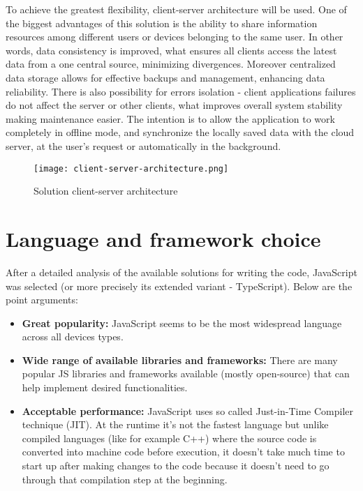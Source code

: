 To achieve the greatest flexibility, client-server architecture will be used. One of the biggest advantages of this solution is the ability to share information resources among different users or devices belonging to the same user. In other words, data consistency is improved, what ensures all clients access the latest data from a one central source, minimizing divergences. Moreover centralized data storage allows for effective backups and management, enhancing data reliability. There is also possibility for errors isolation - client applications failures do not affect the server or other clients, what improves overall system stability making  maintenance easier.
The intention is to allow the application to work completely in offline mode, and synchronize the locally saved data with the cloud server, at the user's request or automatically in the background. 

\begin{figure}[H]
    \centering
    \texttt{[image: client-server-architecture.png]}
    \caption[Solution Architecture]{\label{fig:architecture} Solution client-server architecture }
\end{figure}

 

\section{{Language and framework choice}}

After a detailed analysis of the available solutions for writing the code, JavaScript was selected (or more precisely its extended variant - TypeScript). Below are the point arguments:

\begin{itemize}
  \item \textbf{Great popularity:} JavaScript seems to be the most widespread language across all devices types.
  \item \textbf{Wide range of available libraries and frameworks:} There are many popular JS libraries and frameworks available (mostly open-source) that can help implement desired functionalities.
  \item \textbf{Acceptable performance:} JavaScript uses so called Just-in-Time Compiler technique (JIT)\autocite{JIT}. At the runtime it's not the fastest language but unlike compiled languages (like for example C++) where the source code is converted into machine code before execution, it doesn't take much time to start up after making changes to the code because it doesn't need to go through that compilation step at the beginning.
\end{itemize}

